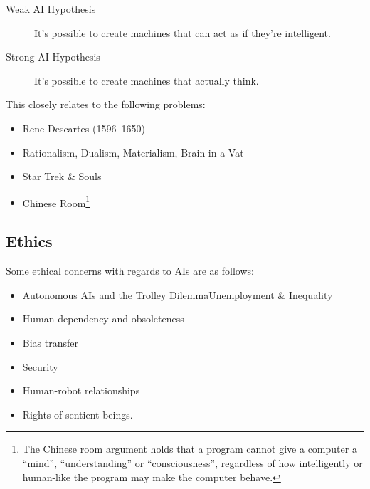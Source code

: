 \begin{description}
    \item[Weak AI Hypothesis] It's possible to create machines that can act as if they're intelligent.
    \item[Strong AI Hypothesis] It's possible to create machines that actually think.
\end{description}

This closely relates to the following problems:

\begin{itemize}
    \item Rene Descartes (1596--1650)
    \item Rationalism, Dualism, Materialism, Brain in a Vat
    \item Star Trek \& Souls
    \item Chinese Room\footnote{The Chinese room argument holds that a program cannot give a computer a ``mind'', ``understanding'' or ``consciousness'', regardless of how intelligently or human-like the program may make the computer behave.}
\end{itemize}

\subsection{Ethics}
Some ethical concerns with regards to AIs are as follows:
\begin{itemize}
    \item Autonomous AIs and the \href{http://www.trolleydilemma.com/}{Trolley Dilemma}Unemployment & Inequality
    \item Human dependency and obsoleteness
    \item Bias transfer
    \item Security
    \item Human-robot relationships
    \item Rights of sentient beings.
\end{itemize}
